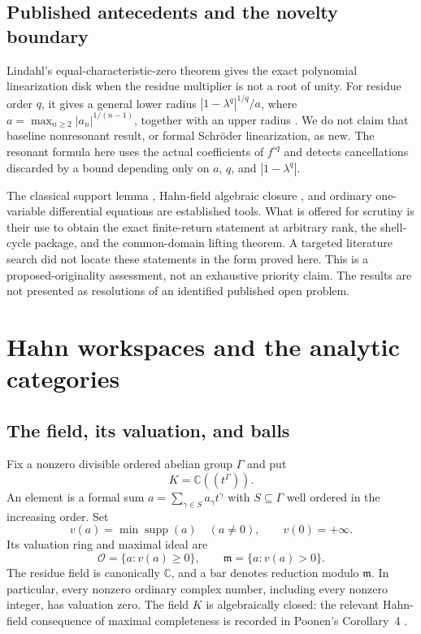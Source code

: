\documentclass[11pt,letterpaper]{article}
\numberwithin{equation}{section}
\theoremstyle{plain}
\theoremstyle{definition}
\theoremstyle{remark}
\newcommand{\C}{\mathbb C}
\newcommand{\OO}{\mathcal O}
\newcommand{\mm}{\mathfrak m}
\newcommand{\supp}{\operatorname{supp}}
\begin{document}
\subsection{Published antecedents and the novelty boundary}

Lindahl's equal-characteristic-zero theorem gives the exact polynomial
linearization disk when the residue multiplier is not a root of unity.
For residue order $q$, it gives a general lower radius
$|1-\lambda^q|^{1/q}/a$, where
$a=\max_{n\ge2}|a_n|^{1/(n-1)}$, together with an upper radius
\cite[Theorem~1.1]{lindahl-equal}. We do not claim that baseline
nonresonant result, or formal Schr\"oder linearization, as new. The resonant
formula here uses the actual coefficients of $f^{\circ q}$ and detects
cancellations discarded by a bound depending only on $a$, $q$, and
$|1-\lambda^q|$.

The classical support lemma \cite{neumann}, Hahn-field algebraic closure
\cite{poonen}, and ordinary one-variable differential equations are established
tools. What is offered for scrutiny is their use to obtain the exact
finite-return statement at arbitrary rank, the shell-cycle package, and the
common-domain lifting theorem. A targeted literature search did not locate
these statements in the form proved here. This is a proposed-originality
assessment, not an exhaustive priority claim. The results are not presented
as resolutions of an identified published open problem.

\section{Hahn workspaces and the analytic categories}\label{sec:setup}

\subsection{The field, its valuation, and balls}

Fix a nonzero divisible ordered abelian group $\Gamma$ and put
\[
 K=\C((t^\Gamma)).
\]
An element is a formal sum $a=\sum_{\gamma\in S}a_\gamma t^\gamma$ with
$S\subseteq\Gamma$ well ordered in the increasing order. Set
\[
 v(a)=\min\supp(a)\quad(a\ne0),\qquad v(0)=+\infty.
\]
Its valuation ring and maximal ideal are
\[
 \OO=\{a:v(a)\ge0\},\qquad \mm=\{a:v(a)>0\}.
\]
The residue field is canonically $\C$, and a bar denotes reduction modulo
$\mm$. In particular, every nonzero ordinary complex number, including every
nonzero integer, has valuation zero. The field $K$ is algebraically closed:
the relevant Hahn-field consequence of maximal completeness is recorded in
Poonen's Corollary~4 \cite{poonen}.
\end{document}
